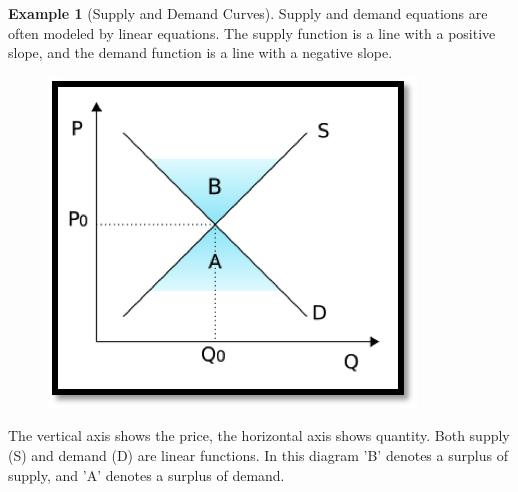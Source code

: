 \documentclass[10pt,]{book}
\theoremstyle{plain}
\theoremstyle{definition}
\newtheorem{example}[theorem]{Example}
\theoremstyle{definition}
\begin{document}
\begin{example}[Supply and Demand Curves]\label{example-1}
 Supply and demand equations are often modeled by linear equations. The supply function is a line with a positive slope, and the demand function is a line with a negative slope.%
\leavevmode%
\begin{figure}
\centering
\includegraphics[width=0.5\linewidth]{images/sec1-1-SDcurves.png}
\end{figure}
\par
The vertical axis shows the price, the horizontal axis shows quantity. Both supply (S) and demand (D) are linear functions. In this diagram 'B' denotes a surplus of supply, and 'A' denotes a surplus of demand.%
\end{example}
\par
\end{document}
